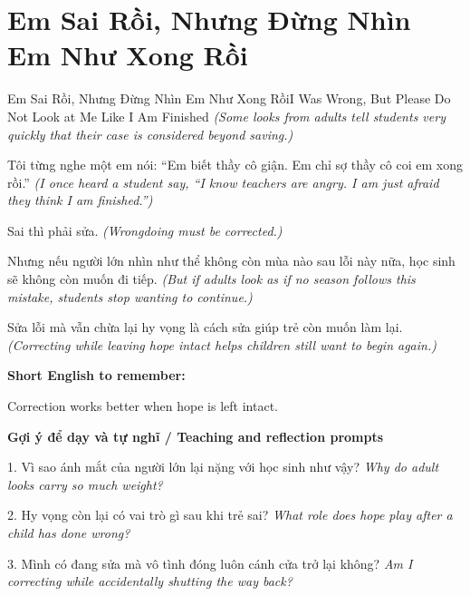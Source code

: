 \section{Em Sai Rồi, Nhưng Đừng Nhìn Em Như Xong Rồi}
\begin{truyen}{Em Sai Rồi, Nhưng Đừng Nhìn Em Như Xong Rồi}{I Was Wrong, But Please Do Not Look at Me Like I Am Finished}
\textit{(Some looks from adults tell students very quickly that their case is considered beyond saving.)}

Tôi từng nghe một em nói: “Em biết thầy cô giận. Em chỉ sợ thầy cô coi em xong rồi.”
\textit{(I once heard a student say, “I know teachers are angry. I am just afraid they think I am finished.”)}

Sai thì phải sửa.
\textit{(Wrongdoing must be corrected.)}

Nhưng nếu người lớn nhìn như thể không còn mùa nào sau lỗi này nữa, học sinh sẽ không còn muốn đi tiếp.
\textit{(But if adults look as if no season follows this mistake, students stop wanting to continue.)}

\end{truyen}

\begin{baihoc}
Sửa lỗi mà vẫn chừa lại hy vọng là cách sửa giúp trẻ còn muốn làm lại.
\textit{(Correcting while leaving hope intact helps children still want to begin again.)}
\end{baihoc}

\begin{ghinhoanh}
\textbf{Short English to remember:}

Correction works better when hope is left intact.

\end{ghinhoanh}

\begin{tuhocnhanh}
\textbf{Gợi ý để dạy và tự nghĩ / Teaching and reflection prompts}

1. Vì sao ánh mắt của người lớn lại nặng với học sinh như vậy? \textit{Why do adult looks carry so much weight?}

2. Hy vọng còn lại có vai trò gì sau khi trẻ sai? \textit{What role does hope play after a child has done wrong?}

3. Mình có đang sửa mà vô tình đóng luôn cánh cửa trở lại không? \textit{Am I correcting while accidentally shutting the way back?}
\end{tuhocnhanh}
\ngancach

